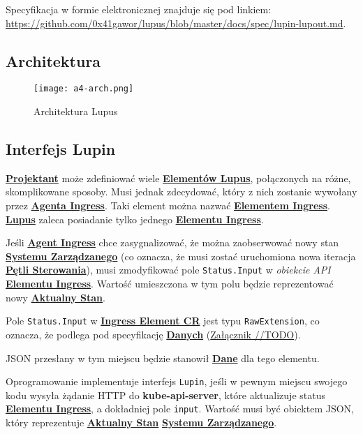 \label{appendix:4}

Specyfikacja w formie elektronicznej znajduje się pod linkiem: \url{https://github.com/0x41gawor/lupus/blob/master/docs/spec/lupin-lupout.md}.

\subsection{Architektura}

\begin{figure}[!h]
    \centering \texttt{[image: a4-arch.png]}
    \caption{Architektura Lupus}\label{fig:a4-arch}
\end{figure}

\subsection{Interfejs Lupin}

\hyperlink{def:projektant}{\textbf{Projektant}} może zdefiniować wiele \hyperlink{def:element-lupus}{\textbf{Elementów Lupus}}, połączonych na różne, skomplikowane sposoby. Musi jednak zdecydować, który z nich zostanie wywołany przez \hyperlink{def:agent-ingress}{\textbf{Agenta Ingress}}. Taki element można nazwać \hyperlink{def:element-ingres}{\textbf{Elementem Ingress}}. \hyperlink{def:lupus}{\textbf{Lupus}} zaleca posiadanie tylko jednego \hyperlink{def:element-ingres}{\textbf{Elementu Ingress}}.

Jeśli \hyperlink{def:agent-ingress}{\textbf{Agent Ingress}} chce zasygnalizować, że można zaobserwować nowy stan \hyperlink{def:system-zarzadzany}{\textbf{Systemu Zarządzanego}} (co oznacza, że musi zostać uruchomiona nowa iteracja \hyperlink{def:zamknieta-petla-sterowania}{\textbf{Pętli Sterowania}}), musi zmodyfikować pole \texttt{Status.Input} w \textit{obiekcie API} \hyperlink{def:element-ingres}{\textbf{Elementu Ingress}}. Wartość umieszczona w tym polu będzie reprezentować nowy \hyperlink{def:stan-aktualny}{\textbf{Aktualny Stan}}.

Pole \texttt{Status.Input} w \hyperlink{def:element-ingres}{\textbf{Ingress Element CR}} jest typu \texttt{RawExtension}, co oznacza, że podlega pod specyfikację \hyperlink{def:dane}{\textbf{Danych}} (\hyperref[appendix://TODO]{Załącznik //TODO}).

JSON przesłany w tym miejscu będzie stanowił \hyperlink{def:dane}{\textbf{Dane}} dla tego elementu.

Oprogramowanie implementuje interfejs \texttt{Lupin}, jeśli w pewnym miejscu swojego kodu wysyła żądanie HTTP do \textbf{kube-api-server}, które aktualizuje status \hyperlink{def:element-ingres}{\textbf{Elementu Ingress}}, a dokładniej pole \texttt{input}. Wartość musi być obiektem JSON, który reprezentuje \hyperlink{def:stan-aktualny}{\textbf{Aktualny Stan}} \hyperlink{def:system-zarzadzany}{\textbf{Systemu Zarządzanego}}. 

